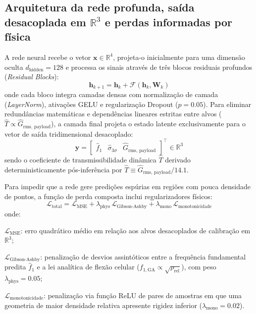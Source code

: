 \subsection{Arquitetura da rede profunda, saída desacoplada em \texorpdfstring{$\mathbb{R}^3$}{R3} e perdas informadas por física}
A rede neural recebe o vetor $\mathbf{x} \in \mathbb{R}^4$, projeta-o inicialmente para uma dimensão oculta $d_{\text{hidden}} = 128$ e processa os sinais através de três blocos residuais profundos (\textit{Residual Blocks}):
\begin{equation}
  \mathbf{h}_{k+1} = \mathbf{h}_k + \mathcal{F}(\mathbf{h}_k, \mathbf{W}_k)
  \label{eq:resnet-block}
\end{equation}
onde cada bloco integra camadas densas com normalização de camada (\textit{LayerNorm}), ativações GELU e regularização Dropout ($p = \num{0.05}$). Para eliminar redundâncias matemáticas e dependências lineares estritas entre alvos ($\hat{T} \propto \hat{G}_{\text{rms, payload}}$), a camada final projeta o estado latente exclusivamente para o vetor de saída tridimensional desacoplado:
\begin{equation}
  \hat{\mathbf{y}} = \begin{bmatrix} \hat{f}_1 & \hat{\sigma}_{3\sigma} & \hat{G}_{\text{rms, payload}} \end{bmatrix}^{\top} \in \mathbb{R}^3
  \label{eq:saida-resnet}
\end{equation}
sendo o coeficiente de transmissibilidade dinâmica $\hat{T}$ derivado deterministicamente pós-inferência por $\hat{T} \equiv \hat{G}_{\text{rms, payload}} / \num{14.1}$.

Para impedir que a rede gere predições espúrias em regiões com pouca densidade de pontos, a função de perda composta inclui regularizadores físicos:
\begin{equation}
  \mathcal{L}_{\text{total}} = \mathcal{L}_{\text{MSE}} + \lambda_{\text{phys}}\,\mathcal{L}_{\text{Gibson-Ashby}} + \lambda_{\text{mono}}\,\mathcal{L}_{\text{monotonicidade}}
  \label{eq:perda-composta}
\end{equation}
onde:
\begin{alineas}
  \item $\mathcal{L}_{\text{MSE}}$: erro quadrático médio em relação aos alvos desacoplados de calibração em $\mathbb{R}^3$;
  \item $\mathcal{L}_{\text{Gibson-Ashby}}$: penalização de desvios assintóticos entre a frequência fundamental predita $\hat{f}_1$ e a lei analítica de flexão celular ($f_{1,\text{GA}} \propto \sqrt{\rho_{\text{rel}}}$), com peso $\lambda_{\text{phys}} = \num{0.05}$;
  \item $\mathcal{L}_{\text{monotonicidade}}$: penalização via função ReLU de pares de amostras em que uma geometria de maior densidade relativa apresente rigidez inferior ($\lambda_{\text{mono}} = \num{0.02}$).
\end{alineas}

